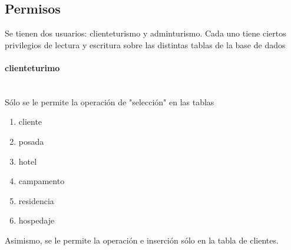 \documentclass{article}
\begin{document}
\subsection{Permisos}
Se tienen dos usuarios: cliente\textunderscore turismo y admin\textunderscore turismo. Cada uno tiene ciertos privilegios de lectura y escritura sobre las distintas tablas de la base de dados
\paragraph{cliente\textunderscore turimo}\mbox{}\\
Sólo se le permite la operación de "selección" en las tablas
\begin{enumerate}
    \item cliente
    \item posada
    \item hotel
    \item campamento
    \item residencia
    \item hospedaje
\end{enumerate}
Asimismo, se le permite la operación e inserción sólo en la tabla de clientes.
\end{document}
